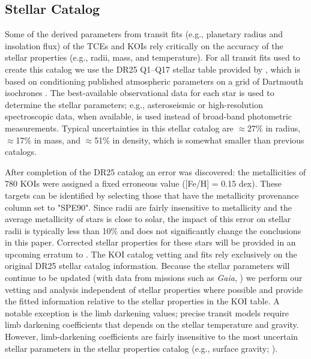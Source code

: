 \subsection{Stellar Catalog}
\label{s:stars}
Some of the derived parameters from transit fits (e.g., planetary radius and insolation flux) of the TCEs and KOIs rely critically on the accuracy of the stellar properties (e.g., radii, mass, and temperature). For all transit fits used to create this catalog we use the DR25 Q1--Q17 stellar table provided by \citet{Mathur2017ApJS}, which is based on conditioning published atmospheric parameters on a grid of Dartmouth isochrones \citep{Dotter2008}. The best-available observational data for each star is used to determine the stellar parameters; e.g., asteroseismic or high-resolution spectroscopic data, when available, is used instead of broad-band photometric measurements. Typical uncertainties in this stellar catalog are $\approx$27\% in radius, $\approx$17\% in mass, and $\approx$51\% in density, which is somewhat smaller than previous catalogs.

After completion of the DR25 catalog an error was discovered: the metallicities of 780 KOIs were assigned a fixed erroneous value ([Fe/H] = 0.15 dex). These targets can be identified by selecting those that have the metallicity provenance column set to "SPE90". Since radii are fairly insensitive to metallicity and the average metallicity of \Kepler stars is close to solar, the impact of this error on stellar radii is typically less than 10\% and does not significantly change the conclusions in this paper. Corrected stellar properties for these stars will be provided in an upcoming erratum to \citet{Mathur2017ApJS}. The KOI catalog vetting and fits rely exclusively on the original DR25 stellar catalog information. Because the stellar parameters will continue to be updated (with data from missions such as \emph{Gaia}, \citealt{gaia1,gaia2}) we perform our vetting and analysis independent of stellar properties where possible and provide the fitted information relative to the stellar properties in the KOI table.  A notable exception is the limb darkening values; precise transit models require limb darkening coefficients that depends on the stellar temperature and gravity. However, limb-darkening coefficients are fairly insensitive to the most uncertain stellar parameters in the stellar properties catalog (e.g., surface gravity; \citealt{Claret2000}).

